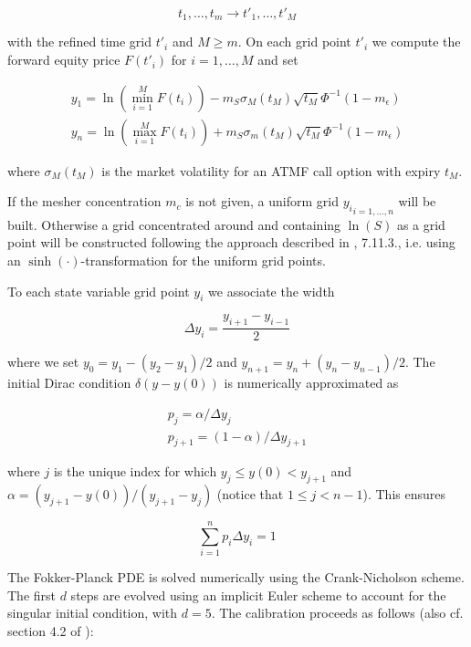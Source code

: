 \begin{equation}
  t_1, \ldots, t_m \rightarrow t'_1, \ldots, t'_M
\end{equation}

with the refined time grid $t'_i$ and $M\geq m$. On each grid point $t'_i$ we compute the forward equity price $F(t'_i)$
for $i=1,\ldots,M$ and set

\begin{eqnarray}
y_1 = \ln \left( \min_{i=1}^M F(t_i) \right) - m_S \sigma_M(t_M)\sqrt{t_M} \Phi^{-1}(1 - m_\epsilon) \\
y_n = \ln \left( \max_{i=1}^M F(t_i) \right) + m_S \sigma_m(t_M)\sqrt{t_M} \Phi^{-1}(1 - m_\epsilon)
\end{eqnarray}

where $\sigma_M(t_M)$ is the market volatility for an ATMF call option with expiry $t_M$.

If the mesher concentration $m_c$ is not given, a uniform grid ${y_i}_{i=1,\ldots,n}$ will be built. Otherwise a grid
concentrated around and containing $\ln(S)$ as a grid point will be constructed following the approach described in
\cite{Clark_FXBook}, 7.11.3., i.e. using an $\sinh(\cdot)$-transformation for the uniform grid points.

To each state variable grid point $y_i$ we associate the width

\begin{equation}
\Delta y_i = \frac{y_{i+1} - y_{i-1}}{2}
\end{equation}

where we set $y_0 =y_1 - (y_2 - y_1) / 2$ and $y_{n+1} = y_n + (y_n - y_{n-1}) / 2$. The initial Dirac condition
$\delta(y-y(0))$ is numerically approximated as

\begin{eqnarray}
  p_j = \alpha / \Delta y_j \\
  p_{j+1} = (1-\alpha) / \Delta y_{j+1}
\end{eqnarray}

where $j$ is the unique index for which $y_j \leq y(0) < y_{j+1}$ and $\alpha = (y_{j+1} - y(0)) / (y_{j+1}-y_j)$
(notice that $1 \leq j < n - 1$). This ensures

\begin{equation}
  \sum_{i=1}^n p_i \Delta y_i = 1
\end{equation}

The Fokker-Planck PDE is solved numerically using the Crank-Nicholson scheme. The first $d$ steps are evolved using an
implicit Euler scheme to account for the singular initial condition, with $d=5$. The calibration proceeds as follows
(also cf. section 4.2 of \cite{Andersen_Buffum_2002}):

